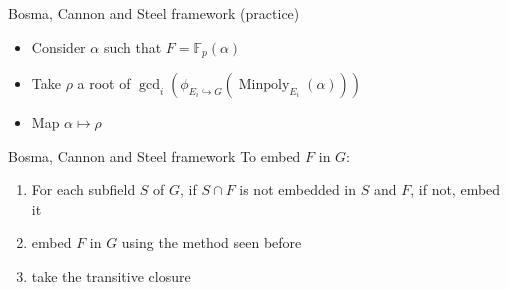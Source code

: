 \documentclass[xcolor=x11names,compress]{beamer}
\theoremstyle{break}
\theoremstyle{sc}
\theoremstyle{definition}
\theoremstyle{remark}
\DeclareMathOperator{\Minpoly}{Minpoly}
\newcommand{\embed}[2]{\phi_{#1\hookrightarrow#2}}
\begin{document}
\begin{frame}{Bosma, Cannon and Steel framework (practice)}
     \begin{figure}
    \centering
  \end{figure}
   \begin{itemize}
    \item Consider $\alpha$ such that $F=\mathbb{F}_p(\alpha)$
    \item Take $\rho$ a root of
      $\gcd_i(\embed{E_i}{G}(\Minpoly_{E_i}(\alpha)))$
    \item Map $\alpha\mapsto\rho$
  \end{itemize}
\end{frame}
\begin{frame}{Bosma, Cannon and Steel framework}
  To embed $F$ in $G$:
  \begin{enumerate}
    \item For each subfield $S$ of $G$, if $S\cap F$ is not embedded in $S$ and
      $F$, if not, embed it
    \item embed $F$ in $G$ using the method seen before
    \item take the transitive closure
  \end{enumerate}
\end{frame}
\end{document}
